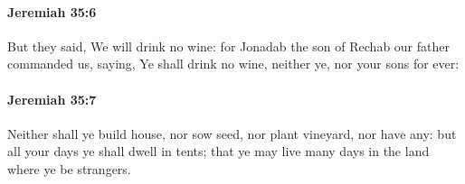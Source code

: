 		\paragraph{Jeremiah 35:6} %
			\label{JEREMIAH-35-6}

			But they said, We will drink no wine: for Jonadab the son of Rechab our father commanded us, saying, Ye shall drink no wine, neither ye, nor your sons for ever:


		\paragraph{Jeremiah 35:7} %
			\label{JEREMIAH-35-7}

			Neither shall ye build house, nor sow seed, nor plant vineyard, nor have any: but all your days ye shall dwell in tents; that ye may live many days in the land where ye be strangers.


